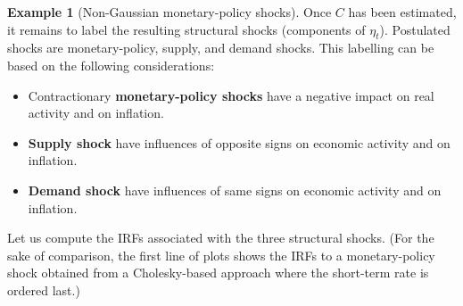 \documentclass[
  12pt,
]{book}
\providecommand{\tightlist}{%
  \setlength{\itemsep}{0pt}\setlength{\parskip}{0pt}}
\theoremstyle{definition}
\theoremstyle{definition}
\newtheorem{example}{Example}[chapter]
\theoremstyle{definition}
\theoremstyle{definition}
\theoremstyle{remark}
\begin{document}
\begin{example}[Non-Gaussian monetary-policy shocks]
Once \(C\) has been estimated, it remains to label the resulting structural shocks (components of \(\eta_{t}\)). Postulated shocks are monetary-policy, supply, and demand shocks. This labelling can be based on the following considerations:

\begin{itemize}
\tightlist
\item
  Contractionary \textbf{monetary-policy shocks} have a negative impact on real activity and on inflation.
\item
  \textbf{Supply shock} have influences of opposite signs on economic activity and on inflation.
\item
  \textbf{Demand shock} have influences of same signs on economic activity and on inflation.
\end{itemize}

Let us compute the IRFs associated with the three structural shocks. (For the sake of comparison, the first line of plots shows the IRFs to a monetary-policy shock obtained from a Cholesky-based approach where the short-term rate is ordered last.)


\end{example}
\end{document}

